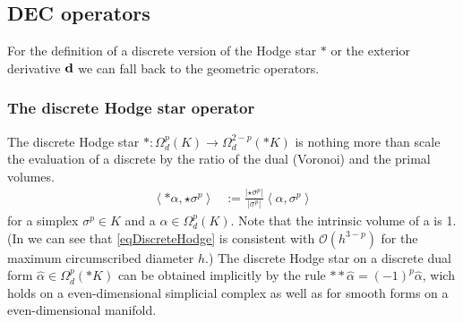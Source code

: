   \subsection{DEC operators}
    For the definition of a discrete version of the Hodge star \( * \) or the exterior derivative \( \mathbf{d} \) we can fall back to the
    geometric operators.

    \subsubsection{The discrete Hodge star operator}
      The discrete Hodge star \( *:\Omega_{d}^{p}(K)\rightarrow\Omega_{d}^{2-p}(*K) \) 
      is nothing more than scale the evaluation of a discrete by the
      ratio of the dual (Voronoi) and the primal volumes.  
      \begin{align}
      \label{eqDiscreteHodge}
        \left\langle *\alpha, \star\sigma^{p} \right\rangle 
                                        &:= \frac{|\star\sigma^{p}|}{|\sigma^{p}|} \left\langle \alpha, \sigma^{p} \right\rangle
      \end{align}
      for a simplex \( \sigma^{p}\in K \) and a \( \alpha\in\Omega_{d}^{p}(K) \).
      Note that the intrinsic volume of a  is 1.
      (In \cite{diploma} we can see that \eqref{eqDiscreteHodge} is consistent with \( \mathcal{O}(h^{3-p}) \) for the maximum circumscribed diameter \( h \).)
      The discrete Hodge star on a discrete dual form \( \hat{\alpha}\in\Omega_{d}^{p}(*K) \) can be  obtained implicitly by the rule
      \( **\hat{\alpha} = (-1)^{p}\hat{\alpha} \), wich holds on a even-dimensional simplicial complex as well as for smooth forms on a
      even-dimensional manifold. 

